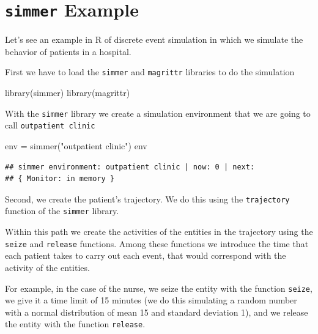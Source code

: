 \documentclass[
]{book}
\newenvironment{Shaded}{\begin{snugshade}}{\end{snugshade}}
\newcommand{\FunctionTok}[1]{\textcolor[rgb]{0.00,0.00,0.00}{#1}}
\newcommand{\NormalTok}[1]{#1}
\newcommand{\OtherTok}[1]{\textcolor[rgb]{0.56,0.35,0.01}{#1}}
\newcommand{\StringTok}[1]{\textcolor[rgb]{0.31,0.60,0.02}{#1}}
\theoremstyle{definition}
\theoremstyle{definition}
\theoremstyle{definition}
\theoremstyle{definition}
\theoremstyle{remark}
\begin{document}
\hypertarget{simmer-example}{%
\section{\texorpdfstring{\texttt{simmer} Example}{simmer Example}}\label{simmer-example}}

Let's see an example in R of discrete event simulation in which we simulate the behavior of patients in a hospital.

First we have to load the \texttt{simmer} and \texttt{magrittr} libraries to do the simulation

\begin{Shaded}
\begin{Highlighting}[]
\FunctionTok{library}\NormalTok{(simmer)}
\FunctionTok{library}\NormalTok{(magrittr)}
\end{Highlighting}
\end{Shaded}

With the \texttt{simmer} library we create a simulation environment that we are going to call \texttt{outpatient\ clinic}

\begin{Shaded}
\begin{Highlighting}[]
\NormalTok{env }\OtherTok{=} \FunctionTok{simmer}\NormalTok{(}\StringTok{"outpatient clinic"}\NormalTok{)}
\NormalTok{env}
\end{Highlighting}
\end{Shaded}

\begin{verbatim}
## simmer environment: outpatient clinic | now: 0 | next: 
## { Monitor: in memory }
\end{verbatim}

Second, we create the patient's trajectory. We do this using the \texttt{trajectory} function of the \texttt{simmer} library.

Within this path we create the activities of the entities in the trajectory using the \texttt{seize} and \texttt{release} functions. Among these functions we introduce the time that each patient takes to carry out each event, that would correspond with the activity of the entities.

For example, in the case of the nurse, we seize the entity with the function \texttt{seize}, we give it a time limit of 15 minutes (we do this simulating a random number with a normal distribution of mean 15 and standard deviation 1), and we release the entity with the function \texttt{release}.
\end{document}
